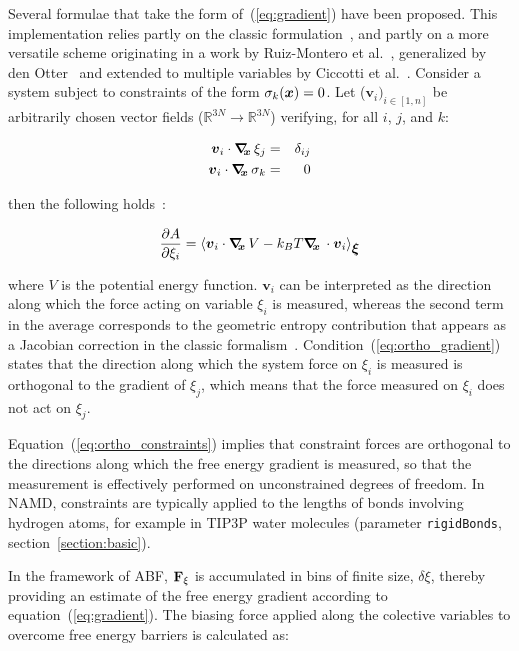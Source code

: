 Several formulae that take the form of~(\ref{eq:gradient}) have been
proposed.  This implementation relies partly on the classic
formulation~\cite{Carter1989}, and partly on a more versatile scheme
originating in a work by Ruiz-Montero et al.~\cite{Ruiz-Montero1997},
generalized by den Otter~\cite{denOtter2000} and extended to multiple
variables by Ciccotti et al.~\cite{Ciccotti2005}.  Consider a system
subject to constraints of the form $\sigma_{k}({\mbox{\boldmath{$x$}}}) = 0$.  Let
($\bm{v}_{i})_{i\in[1,n]}$ be arbitrarily chosen vector fields
($\mathbb{R}^{3N}\rightarrow\mathbb{R}^{3N}$) verifying, for all $i$,
$j$, and $k$:

\begin{eqnarray}
\label{eq:ortho_gradient}
{\mbox{\boldmath{$v$}}}_{i} \cdot \mbox{\boldmath$\nabla_{\!\!x}\,$} \xi_{j}    & = & \delta_{ij}\\
\label{eq:ortho_constraints}
{\mbox{\boldmath{$v$}}}_{i} \cdot \mbox{\boldmath$\nabla_{\!\!x}\,$} \sigma_{k} & = & 0
\end{eqnarray}

then the following holds~\cite{Ciccotti2005}:

\begin{equation}
\label{eq:gradient_vector}
\frac{\partial A}{\partial \xi_{i}} = \left\langle {\mbox{\boldmath{$v$}}}_{i} \cdot \mbox{\boldmath$\nabla_{\!\!x}\,$} V
- k_B T \mbox{\boldmath$\nabla_{\!\!x}\,$} \cdot {\mbox{\boldmath{$v$}}}_{i} \right\rangle_{\mbox{\boldmath{$\xi$}}}
\end{equation}

where $V$ is the potential energy function.
$\bm{v}_{i}$ can be interpreted as the direction along which the force
acting on variable $\xi_{i}$ is measured, whereas the second term in the
average corresponds to the geometric entropy contribution that appears
as a Jacobian correction in the classic formalism~\cite{Carter1989}.
Condition~(\ref{eq:ortho_gradient}) states that the direction along
which the system force on $\xi_{i}$ is measured is orthogonal to the
gradient of $\xi_{j}$, which means that the force measured on $\xi_{i}$
does not act on $\xi_{j}$.

Equation~(\ref{eq:ortho_constraints}) implies that constraint forces
are orthogonal to the directions along which the free energy gradient is
measured, so that the measurement is effectively performed on unconstrained
degrees of freedom. In NAMD, constraints are typically applied to the lengths of
bonds involving hydrogen atoms, for example in TIP3P water molecules
(parameter \texttt{rigidBonds}, section~\ref{section:basic}).


In the framework of ABF,
${\bf F}_\xi$ is accumulated in bins of finite size, $\delta \xi$,
thereby providing an estimate of the free energy gradient
according to equation~({\ref{eq:gradient}}).
The biasing force applied along the colective variables
to overcome free energy barriers is calculated as:

